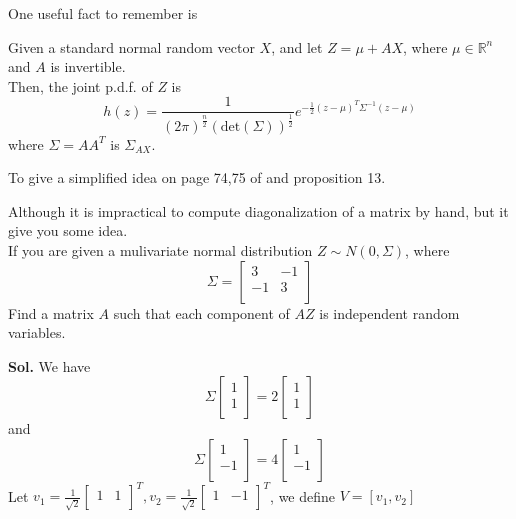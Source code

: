 One useful fact to remember is 
\begin{theorem}
    Given a standard normal random vector \(X\), and let \(Z = \mu  + AX\), where \(\mu \in \mathbb{R}^n\) and \(A\) is invertible. 
    \\Then, the joint p.d.f. of \(Z\) is 
    \[
        h(z) = \frac{1}{(2\pi)^{\frac{n}{2}} (\text{det}(\Sigma) )^{\frac{1}{2}}} e^{-\frac{1}{2} (z-\mu )^T \Sigma ^{-1} (z-\mu ) }
    \]     
    where \(\Sigma  = A A^T\) is \(\Sigma_{AX} \). 
\end{theorem}
To give a simplified idea on page 74,75 of \cite*{Und_Chatterjee} and proposition 13. 
\begin{eg}[diagonalization]
    Although it is impractical to compute diagonalization of a matrix by hand, but it give you some idea. 
    \\If you are given a mulivariate normal distribution \(Z \sim N(0, \Sigma )\), where 
    \[
        \Sigma  = \begin{bmatrix}
            3 &  -1 \\
            -1 &  3 \\
        \end{bmatrix}
    \]
    Find a matrix \(A\) such that each component of \(AZ\) is independent random variables.   
\end{eg}
\textbf{Sol.}
We have 
    \[
        \Sigma \begin{bmatrix}
             1 \\
             1 \\
        \end{bmatrix} = 2 \begin{bmatrix}
             1 \\
             1 \\
        \end{bmatrix}
    \]
    and 
    \[
        \Sigma \begin{bmatrix}
             1 \\
             -1 \\
        \end{bmatrix} = 4 \begin{bmatrix}
             1 \\
             -1 \\
        \end{bmatrix}
    \]
    Let \(v_1 = \frac{1}{\sqrt{2} }\begin{bmatrix}
        1 &  1 \\
    \end{bmatrix}^T, v_2 = \frac{1}{\sqrt{2} } \begin{bmatrix}
        1 &  -1 \\
    \end{bmatrix}^{T} \), we define \(V = [v_1, v_2]\)
